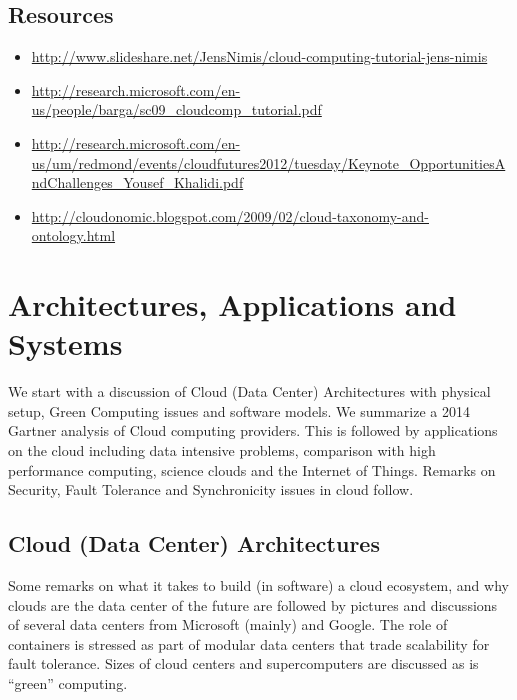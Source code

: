 \subsection{Resources}\label{resources-2}

\begin{itemize}
\item
  \url{http://www.slideshare.net/JensNimis/cloud-computing-tutorial-jens-nimis}
\item
  \url{http://research.microsoft.com/en-us/people/barga/sc09_cloudcomp_tutorial.pdf}
\item
  \url{http://research.microsoft.com/en-us/um/redmond/events/cloudfutures2012/tuesday/Keynote_OpportunitiesAndChallenges_Yousef_Khalidi.pdf}
\item
  \url{http://cloudonomic.blogspot.com/2009/02/cloud-taxonomy-and-ontology.html}
\end{itemize}

\section{Architectures,  Applications and Systems}

We start with a discussion of Cloud (Data Center) Architectures with
physical setup, Green Computing issues and software models. We summarize
a 2014 Gartner analysis of Cloud computing providers. This is followed
by applications on the cloud including data intensive problems,
comparison with high performance computing, science clouds and the
Internet of Things. Remarks on Security, Fault Tolerance and
Synchronicity issues in cloud follow.



\subsection{Cloud (Data Center) Architectures}

Some remarks on what it takes to build (in software) a cloud ecosystem,
and why clouds are the data center of the future are followed by
pictures and discussions of several data centers from Microsoft (mainly)
and Google. The role of containers is stressed as part of modular data
centers that trade scalability for fault tolerance. Sizes of cloud
centers and supercomputers are discussed as is ``green'' computing.



